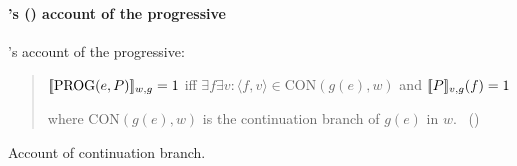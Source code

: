 


\paragraph[\citeauthor{Landman:1992wh}~(\citeyear{Landman:1992wh})]{\citeauthor{Landman:1992wh}'s (\citeyear{Landman:1992wh}) account of the progressive}

\begin{note}
  \citeauthor{Landman:1992wh}'s account of the progressive:

  \begin{quote}
    \(\sem{\text{PROG}(e, P)}_{w,g} = 1\) iff \(\exists f \exists v\colon \langle f,v \rangle \in \text{CON}(g(e), w)\)\newline
    \phantom{an} and \(\sem{P}_{v,g}(f) = 1\)\par

    where \(\text{CON}(g(e), w)\) is the continuation branch of \(g(e)\) in \(w\).\newline
    \mbox{ }\hfill\mbox{(\citeyear[27]{Landman:1992wh})}
  \end{quote}
  Account of continuation branch.
\end{note}

